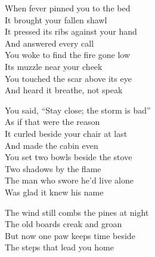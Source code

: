 \begin{lyrics}
When fever pinned you to the bed\\
It brought your fallen shawl\\
It pressed its ribs against your hand\\
And answered every call\\
You woke to find the fire gone low\\
Its muzzle near your cheek\\
You touched the scar above its eye\\
And heard it breathe, not speak

You said, “Stay close; the storm is bad”\\
As if that were the reason\\
It curled beside your chair at last\\
And made the cabin even\\
You set two bowls beside the stove\\
Two shadows by the flame\\
The man who swore he’d live alone\\
Was glad it knew his name

The wind still combs the pines at night\\
The old boards creak and groan\\
But now one paw keeps time beside\\
The steps that lead you home
\end{lyrics}

